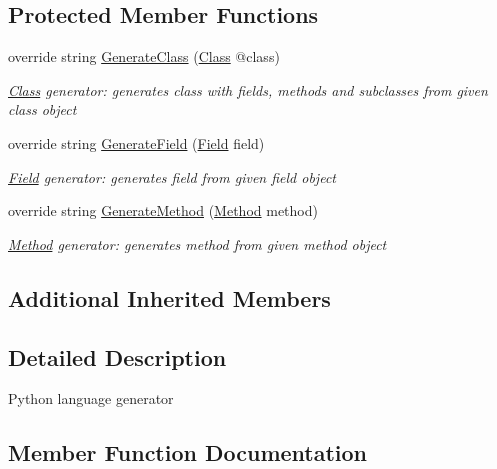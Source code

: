 \subsection*{Protected Member Functions}
\begin{DoxyCompactItemize}
\item 
override string \mbox{\hyperlink{classCodeGen_1_1generators_1_1PythonGenerator_a7ef1629fdf50856e1424ed4fd8be564c}{Generate\+Class}} (\mbox{\hyperlink{classCodeGen_1_1generators_1_1Class}{Class}} @class)
\begin{DoxyCompactList}\small\item\em \mbox{\hyperlink{classCodeGen_1_1generators_1_1Class}{Class}} generator\+: generates class with fields, methods and subclasses from given class object  \end{DoxyCompactList}\item 
override string \mbox{\hyperlink{classCodeGen_1_1generators_1_1PythonGenerator_aafd171ffd14980515eef644b929bd712}{Generate\+Field}} (\mbox{\hyperlink{classCodeGen_1_1generators_1_1Field}{Field}} field)
\begin{DoxyCompactList}\small\item\em \mbox{\hyperlink{classCodeGen_1_1generators_1_1Field}{Field}} generator\+: generates field from given field object  \end{DoxyCompactList}\item 
override string \mbox{\hyperlink{classCodeGen_1_1generators_1_1PythonGenerator_a09ea61b8eb384efcc36aa3574f9cb6a8}{Generate\+Method}} (\mbox{\hyperlink{classCodeGen_1_1generators_1_1Method}{Method}} method)
\begin{DoxyCompactList}\small\item\em \mbox{\hyperlink{classCodeGen_1_1generators_1_1Method}{Method}} generator\+: generates method from given method object  \end{DoxyCompactList}\end{DoxyCompactItemize}
\subsection*{Additional Inherited Members}


\subsection{Detailed Description}
Python language generator 



\subsection{Member Function Documentation}
\mbox{\label{classCodeGen_1_1generators_1_1PythonGenerator_a7ef1629fdf50856e1424ed4fd8be564c}} 
